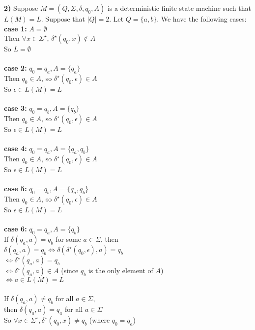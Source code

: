 \documentclass{article}
\begin{document}
\textbf{2)} Suppose $M = (Q, \Sigma, \delta, q_0, A)$ is a deterministic finite state machine such that $L(M) = L$. Suppose that $|Q| = 2$. Let $Q = \{a, b\}$. We have the following cases:\\
\textbf{case 1:} $A = \emptyset$\\
Then $\forall x \in \Sigma^\star$, $\delta^\star(q_0, x) \notin A$\\
So $L = \emptyset$\\ \\
\textbf{case 2:} $q_0 = q_a, A = \{q_a\}$ \\
Then $q_0 \in A$, so $\delta^\star(q_0, \epsilon) \in A$\\
So $\epsilon \in L(M) = L$\\ \\
\textbf{case 3:} $ q_0 = q_b, A = \{q_b\}$\\
Then $q_0 \in A$, so $\delta^\star(q_0, \epsilon) \in A$\\
So $\epsilon \in L(M) = L$\\ \\
\textbf{case 4:} $q_0 = q_a, A = \{q_a, q_b\}$\\
Then $q_0 \in A$, so $\delta^\star(q_0, \epsilon) \in A$\\
So $\epsilon \in L(M) = L$\\ \\
\textbf{case 5:} $q_0 = q_b, A = \{q_a, q_b\}$\\
Then $q_0 \in A$, so $\delta^\star(q_0, \epsilon) \in A$\\
So $\epsilon \in L(M) = L$\\ \\
\textbf{case 6:} $q_0 = q_a, A = \{q_b\}$\\
If $\delta(q_a, a) = q_b$ for some $a \in \Sigma$, then\\
$\delta(q_a, a) = q_b \Leftrightarrow \delta(\delta^\star(q_0, \epsilon), a) = q_b$\\
$\Leftrightarrow \delta^\star(q_a, a) = q_b$\\
$\Leftrightarrow \delta^\star(q_a, a) \in A$ (since $q_b$ is the only element of $A$)\\ 
$\Leftrightarrow a \in L(M) = L$\\ \\
If $\delta(q_a, a) \neq q_b$ for all $a \in \Sigma$,\\ 
then $\delta(q_a, a) = q_a$ for all $a \in \Sigma$\\
So $\forall x \in \Sigma^\star, \delta^\star(q_0, x) \neq q_b$ (where $q_0 = q_a$)\\
\end{document}
